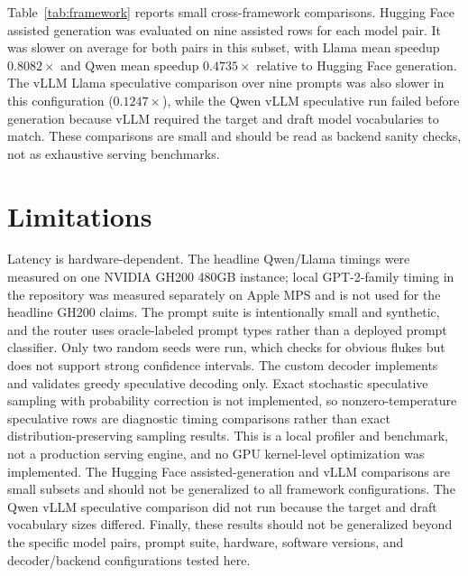 \documentclass{article}
\begin{document}
Table~\ref{tab:framework} reports small cross-framework comparisons.
Hugging Face assisted generation was evaluated on nine assisted rows for each model pair.
It was slower on average for both pairs in this subset, with Llama mean speedup $0.8082\times$ and Qwen mean speedup $0.4735\times$ relative to Hugging Face generation.
The vLLM Llama speculative comparison over nine prompts was also slower in this configuration ($0.1247\times$), while the Qwen vLLM speculative run failed before generation because vLLM required the target and draft model vocabularies to match.
These comparisons are small and should be read as backend sanity checks, not as exhaustive serving benchmarks.

\begin{table}[t]
  \centering
  \caption{Small cross-framework comparisons generated from committed CSVs.}
  \label{tab:framework}
  \resizebox{\textwidth}{!}{}
\end{table}

\section{Limitations}

Latency is hardware-dependent.
The headline Qwen/Llama timings were measured on one NVIDIA GH200 480GB instance; local GPT-2-family timing in the repository was measured separately on Apple MPS and is not used for the headline GH200 claims.
The prompt suite is intentionally small and synthetic, and the router uses oracle-labeled prompt types rather than a deployed prompt classifier.
Only two random seeds were run, which checks for obvious flukes but does not support strong confidence intervals.
The custom decoder implements and validates greedy speculative decoding only.
Exact stochastic speculative sampling with probability correction is not implemented, so nonzero-temperature speculative rows are diagnostic timing comparisons rather than exact distribution-preserving sampling results.
This is a local profiler and benchmark, not a production serving engine, and no GPU kernel-level optimization was implemented.
The Hugging Face assisted-generation and vLLM comparisons are small subsets and should not be generalized to all framework configurations.
The Qwen vLLM speculative comparison did not run because the target and draft vocabulary sizes differed.
Finally, these results should not be generalized beyond the specific model pairs, prompt suite, hardware, software versions, and decoder/backend configurations tested here.
\end{document}
